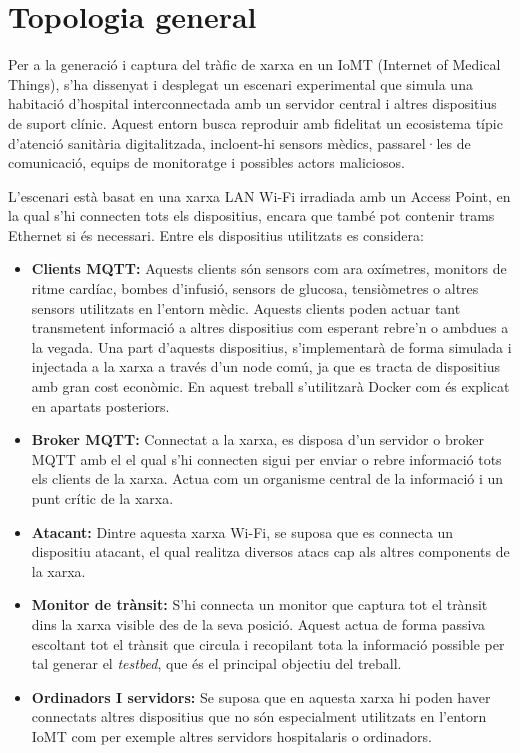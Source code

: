 \section{Topologia general}
\label{sec:Topologia}
  Per a la generació i captura del tràfic de xarxa en un IoMT (Internet of Medical Things), s’ha dissenyat i desplegat un escenari experimental que simula una habitació d’hospital interconnectada amb un servidor central i altres dispositius de suport clínic. Aquest entorn busca reproduir amb fidelitat un ecosistema típic d’atenció sanitària digitalitzada, incloent-hi sensors mèdics, passarel·les de comunicació, equips de monitoratge i possibles actors maliciosos.


  L’escenari està basat en una xarxa LAN Wi-Fi irradiada amb un Access Point, en la qual s’hi connecten tots els dispositius, encara que també pot contenir trams Ethernet si és necessari. Entre els dispositius utilitzats es considera:

  \begin{itemize}
    \item \textbf{Clients MQTT:} Aquests clients són sensors com ara oxímetres, monitors de ritme cardíac, bombes d’infusió, sensors de glucosa, tensiòmetres o altres sensors utilitzats en l’entorn mèdic. Aquests clients poden actuar tant transmetent informació a altres dispositius com esperant rebre’n o ambdues a la vegada. Una part d’aquests dispositius, s’implementarà de forma simulada i injectada a la xarxa a través d’un node comú, ja que es tracta de dispositius amb gran cost econòmic. En aquest treball s’utilitzarà Docker com és explicat en apartats posteriors.
    \item \textbf{Broker MQTT:} Connectat a la xarxa, es disposa d’un servidor o broker MQTT amb el el qual s’hi connecten sigui per enviar o rebre informació tots els clients de la xarxa. Actua com un organisme central de la informació i un punt crític de la xarxa.
    \item \textbf{Atacant:} Dintre aquesta xarxa Wi-Fi, se suposa que es connecta un dispositiu atacant, el qual realitza diversos atacs cap als altres components de la xarxa.
    \item \textbf{Monitor de trànsit:} S’hi connecta un monitor que captura tot el trànsit dins la xarxa visible des de la seva posició. Aquest actua de forma passiva escoltant tot el trànsit que circula i recopilant tota la informació possible per tal generar el \textit{testbed}, que és el principal objectiu del treball.
    \item \textbf{Ordinadors I servidors:} Se suposa que en aquesta xarxa hi poden haver connectats altres dispositius que no són especialment utilitzats en l’entorn IoMT com per exemple altres servidors hospitalaris o ordinadors.
  \end{itemize}


